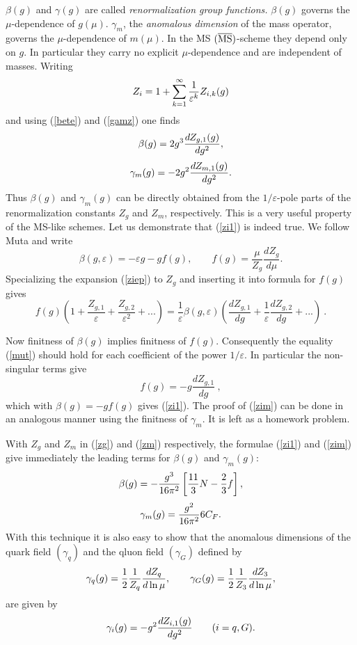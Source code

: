 \documentclass[12pt,rotate]{article}
\def\eps{\varepsilon}
\newcommand{\be}{\begin{equation}}
\newcommand{\ee}{\end{equation}}
\begin{document}
\begin{itemize}
$\beta(g)$ and $\gamma(g)$ are called {\it renormalization group functions.}
$\beta(g)$ governs the $\mu$-dependence of $g(\mu)$.
$\gamma_m$, the {\it anomalous dimension} of the mass operator, governs
the $\mu$-dependence of $m(\mu)$.
In the MS $(\overline{\rm MS})$-scheme they depend only on $g$. 
In particular they carry no explicit $\mu$-dependence and are independent of
masses.
Writing
\begin{equation}\label{ziep}
Z_i=1+\sum^\infty_{k=1} {1\over \eps^k} Z_{i, k}(g)  
\end{equation}
and
using (\ref{bete}) and (\ref{gamz}) one finds
\begin{equation}\label{zi1}
\beta(g)=2 g^3{d Z_{g, 1}(g)\over d g^2},
\ee
\be\label{zim}
\gamma_m(g)=-2 g^2{d Z_{m, 1}(g)\over d g^2}.
\end{equation}
Thus $\beta(g)$ and $\gamma_m(g)$ can be
directly obtained from the $1/\eps$-pole parts of the renormalization
constants $Z_g$ and $Z_m$, respectively. This is a very useful
property of the MS-like schemes. Let us demonstrate that (\ref{zi1})
is indeed true. 
We follow Muta \cite{MUTA} and write
\be
\beta(g, \eps)= -\eps g-g f(g),  
\quad\quad
f(g)=\frac{\mu}{Z_g}\frac{d Z_g}{d\mu}.
\end{equation}
Specializing the expansion (\ref{ziep}) to $Z_g$ and inserting
it into formula for $f(g)$ gives
\be\label{mut}
f(g)\left( 1 +\frac{Z_{g,1}}{\eps}+ \frac{Z_{g,2}}{\eps^2}+...\right)
=\frac{1}{\eps} \beta(g,\eps)
\left(\frac{dZ_{g,1}}{dg}+\frac{1}{\eps}\frac{dZ_{g,2}}{dg}+...\right)~.
\ee

Now finitness of $\beta(g)$ implies finitness of $f(g)$. Consequently
the equality (\ref{mut}) should hold for each coefficient of the
power $1/\eps$. In particular the non-singular terms give
\be
f(g)=-g \frac{dZ_{g,1}}{dg}~,
\ee
which with $\beta(g)=-gf(g)$ gives (\ref{zi1}).
The proof of (\ref{zim}) can be done in an analogous
manner using the finitness of $\gamma_m$. It is left as 
a homework problem.

With $Z_g$ and $Z_m$ in (\ref{zg}) and (\ref{zm}) respectively,
the formulae (\ref{zi1}) and (\ref{zim}) give
 immediately the leading terms for $\beta(g)$ and $\gamma_m(g)$:
\be
\beta(g)= -{g^3\over 16\pi^2}\left[\frac{11}{3}N-\frac{2}{3}f \right],
\ee
\be
\gamma_m(g)={g^2\over 16\pi^2} 6 C_F.
\ee
With this technique it is also easy to show that the anomalous
dimensions of the quark field $(\gamma_q)$ and the qluon field
$(\gamma_G)$ defined by
\be
\gamma_q(g)=\frac{1}{2}{1\over Z_q}{d Z_q\over d\ln\mu},\quad\quad
\gamma_G(g)=\frac{1}{2}{1\over Z_3}{d Z_3\over d\ln\mu},
  \end{equation}
are given by
\be
\gamma_i(g)=- g^2{d Z_{i, 1}(g)\over d g^2} \quad\quad (i=q,G).
\end{equation}


\end{itemize}
\end{document}
